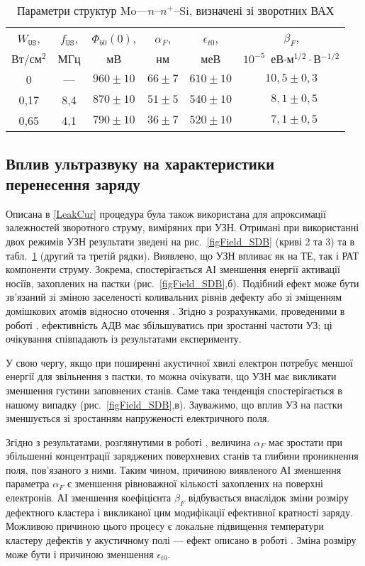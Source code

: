 \begin{table}
\caption{Параметри структур Mo---$n$--$n^+$--Si, визначені зі зворотних ВАХ}
\label{tabSDBParZv}
\centering
\begin{tabular}{|c|c|c|c|c|c|}
\hline
$W_\mathtt{US}$, &$f_\mathtt{US}$,&$\Phi_{b0}(0)$,&$\alpha_F$,&$\epsilon_{t0}$,&$\beta_F$,\\
Вт/см$^2$&МГц&мВ&нм&меВ&$10^{-5}$~еВ$\cdot$м$^{1/2}\cdot$В$^{-1/2}$\\\hline
0&---&$960\pm10$&$66\pm7$&$610\pm10$&$10,5\pm0,3$\\\hline
0,17&8,4&$870\pm10$&$51\pm5$&$540\pm10$&$\;\:8,1\pm0,5$\\\hline
0,65&4,1&$790\pm10$&$36\pm7$&$520\pm10$&$\;\:7,1\pm0,5$\\\hline
\end{tabular}
\end{table}



\subsection{Вплив ультразвуку на характеристики перенесення заряду}

Описана в \ref{LeakCur} процедура була також використана для апроксимації залежностей зворотного струму, виміряних при УЗН.
Отримані при використанні двох режимів УЗН результати зведені на рис.~\ref{figField_SDB} (криві 2 та 3) та в табл.~\ref{tabSDBParZv} (другий та третій рядки).
Виявлено, що УЗН впливає як на ТЕ, так і РАТ компоненти струму.
Зокрема, спостерігається АІ зменшення енергії активації носіїв, захоплених на пастки (рис.~\ref{figField_SDB},б).
Подібний ефект може бути зв'язаний зі зміною заселеності коливальних рівнів дефекту \cite{Pavlovich} або зі зміщенням домішкових
атомів відносно оточення \cite{Korotchenkov1995}.
Згідно з розрахунками, проведеними в роботі \cite{Pavlovich}, ефективність АДВ має збільшуватись при зростанні частоти УЗ;
ці очікування співпадають із результатами експерименту.

У свою чергу, якщо при поширенні акустичної хвилі електрон потребує меншої енергії для звільнення з пастки,
то можна очікувати, що УЗН має викликати зменшення густини заповнених станів.
Саме така тенденція спостерігається в нашому випадку (рис.~\ref{figField_SDB},в).
Зауважимо, що вплив УЗ на пастки зменшується зі зростанням напруженості електричного поля.

Згідно з результатами, розглянутими в роботі \cite{Em:Parker},
величина $\alpha_F$ має зростати при збільшенні концентрації заряджених поверхневих станів та
глибини проникнення поля, пов'язаного  з ними.
Таким чином, причиною виявленого АІ
зменшення параметра $\alpha_F$ є зменшення рівноважної кількості захоплених на поверхні електронів.
АІ зменшення коефіцієнта $\beta_F$ відбувається внаслідок зміни розміру дефектного кластера і викликаної цим
модифікації ефективної кратності заряду.
Можливою причиною цього процесу є локальне підвищення температури кластеру дефектів у акустичному полі ---
ефект описано в роботі \cite{MirzadeJAP2011}.
Зміна розміру може бути і причиною зменшення $\epsilon_{t0}$.

